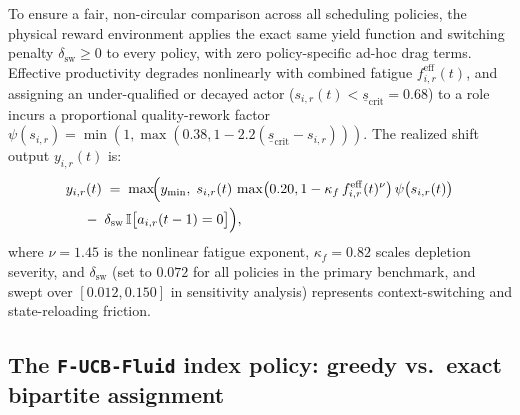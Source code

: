 \documentclass[11pt]{article}
\begin{document}
To ensure a fair, non-circular comparison across all scheduling policies, the physical reward environment applies the exact same yield function and switching penalty $\delta_{\mathrm{sw}} \ge 0$ to every policy, with zero policy-specific ad-hoc drag terms. Effective productivity degrades nonlinearly with combined fatigue $f_{i,r}^{\mathrm{eff}}(t)$, and assigning an under-qualified or decayed actor ($s_{i,r}(t) < \underline{s}_{\mathrm{crit}} = 0.68$) to a role incurs a proportional quality-rework factor $\psi(s_{i,r}) = \min(1,\allowbreak \max(0.38,\allowbreak 1 - 2.2(\underline{s}_{\mathrm{crit}} - s_{i,r})))$. The realized shift output $y_{i,r}(t)$ is:
\begin{equation}
\begin{aligned}
&y_{i,r}(t) \;=\; \max\!\Bigl(y_{\min},\; s_{i,r}(t)\,\max\bigl(0.20, 1 - \kappa_f\, f_{i,r}^{\mathrm{eff}}(t)^{\nu}\bigr)\,\psi\bigl(s_{i,r}(t)\bigr) \\
&\quad \;-\; \delta_{\mathrm{sw}}\,\mathbb{I}\bigl[a_{i,r}(t-1) = 0\bigr]\Bigr),
\end{aligned}
\label{eq:shift_yield}
\end{equation}
where $\nu = 1.45$ is the nonlinear fatigue exponent, $\kappa_f = 0.82$ scales depletion severity, and $\delta_{\mathrm{sw}}$ (set to $0.072$ for all policies in the primary benchmark, and swept over $[0.012, 0.150]$ in sensitivity analysis) represents context-switching and state-reloading friction.

\subsection{The \texttt{F-UCB-Fluid} index policy: greedy vs.\ exact bipartite assignment}
\end{document}
